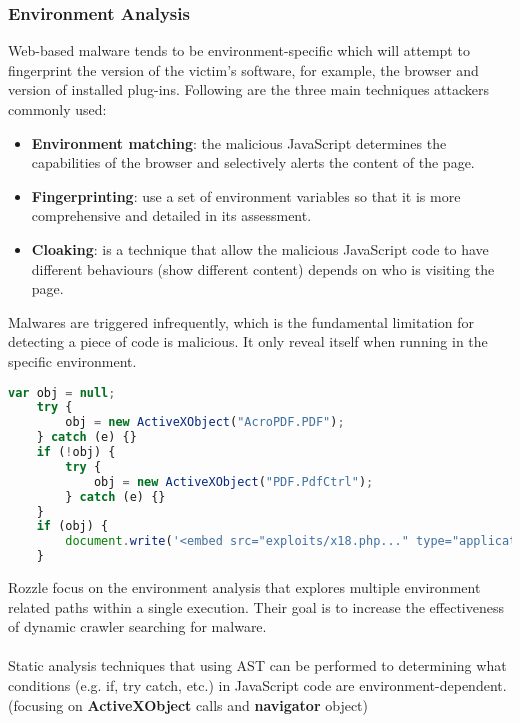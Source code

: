 \subsubsection{Environment Analysis}
Web-based malware tends to be environment-specific which will attempt to fingerprint the version of the victim's software, for example, the browser and version of installed plug-ins. Following are the three main techniques attackers commonly used:
\begin{itemize}
  	\item \textbf{Environment matching}: the malicious JavaScript determines the capabilities of the browser and selectively alerts the content of the page. 
  	\item \textbf{Fingerprinting}: use a set of environment variables so that it is more comprehensive and detailed in its assessment. 
  	\item \textbf{Cloaking}\cite{Cloaking}: is a technique that allow the malicious JavaScript code to have different behaviours (show different content) depends on who is visiting the page.
\end{itemize}
Malwares are triggered infrequently, which is the fundamental limitation for detecting a piece of code is malicious. It only reveal itself when running in the specific environment. 
\begin{lstlisting}[language=JavaScript,title=(Example JavaScript that checks for specific environment)]
	var obj = null;
	try {
	    obj = new ActiveXObject("AcroPDF.PDF");
	} catch (e) {}
	if (!obj) {
	    try {
	        obj = new ActiveXObject("PDF.PdfCtrl");
	    } catch (e) {}
	}
	if (obj) {
	    document.write('<embed src="exploits/x18.php..." type="application/pdf" width=100 height=100></embed>');
	}
\end{lstlisting}
Rozzle\cite{Rozzle} focus on the environment analysis that explores multiple environment related paths within a single execution. Their goal is to increase the effectiveness of dynamic crawler searching for malware. \\ \\
Static analysis techniques that using AST can be performed to determining what conditions (e.g. if, try catch, etc.) in JavaScript code are environment-dependent.(focusing on  \textbf{ActiveXObject} calls and \textbf{navigator} object)
\newpage
